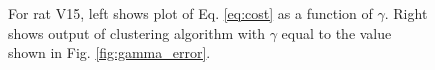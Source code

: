 \documentclass[superscriptaddress, twocolumn, prl]{revtex4}
\begin{document}
\begin{figure}
\centering
{}
\caption{For rat V15, left shows plot of Eq. \ref{eq:cost} as a function of $\gamma$. Right shows output of clustering algorithm with $\gamma$ equal to the value shown in Fig. \ref{fig:gamma_error}.}
\end{figure}
\end{document}
